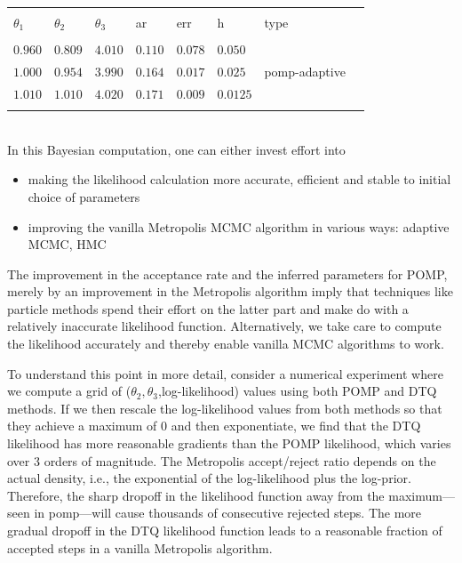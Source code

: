 \documentclass[graybox]{svmult}
\begin{document}
\vspace{-4mm}
\setlength{\tabcolsep}{6pt}
\begin{table}[!htbp] \centering 
\begin{tabular}{llllllll} 
\\[-1.8ex]\hline 
\hline \\[-1.8ex] 
$\theta_1$ & $\theta_2$ & $\theta_3$ & ar & err & h & type \\ 
\hline \\[-1.8ex] 
$0.960$ & $0.809$ & $4.010$ & $0.110$ & $0.078$ & $0.050$ & \\ 
$1.000$ & $0.954$ & $3.990$ & $0.164$ & $0.017$ & $0.025$ & pomp-adaptive \\ 
$1.010$ & $1.010$ & $4.020$ & $0.171$ & $0.009$ & $0.0125$ & \\ 
\hline \\[-1.8ex] 
\end{tabular} 
\label{tbl:pomp-adaptive}
\end{table} 
\vspace{-5mm}
\\
In this Bayesian computation, one can either invest effort into 
\begin{itemize}
\item making the likelihood calculation more accurate, efficient and stable to initial choice of parameters
\item improving the vanilla Metropolis MCMC algorithm in various ways: adaptive MCMC, HMC \cite{gelman2014bayesian}
\end{itemize}
The improvement in the acceptance rate and the inferred parameters for POMP, merely by an improvement in the Metropolis algorithm imply that techniques like particle methods spend their effort on the latter part and make do with a relatively inaccurate likelihood function. Alternatively, we take care to compute the likelihood accurately and thereby enable vanilla MCMC algorithms to work.

To understand this point in more detail, consider a numerical experiment where we compute a grid of ($\theta_2,\theta_3$,log-likelihood) values using both POMP and DTQ methods. If we then rescale the log-likelihood values from both methods so that they achieve a maximum of 0 and then exponentiate, we find that the DTQ likelihood has more reasonable gradients than the POMP likelihood, which varies over 3 orders of magnitude. The Metropolis accept/reject ratio depends on the actual density, i.e., the exponential of the log-likelihood plus the log-prior.  Therefore, the sharp dropoff in the likelihood function away from the maximum---seen in pomp---will cause thousands of consecutive rejected steps. The more gradual dropoff in the DTQ likelihood function leads to a reasonable fraction of accepted steps in a vanilla Metropolis algorithm.
\end{document}
